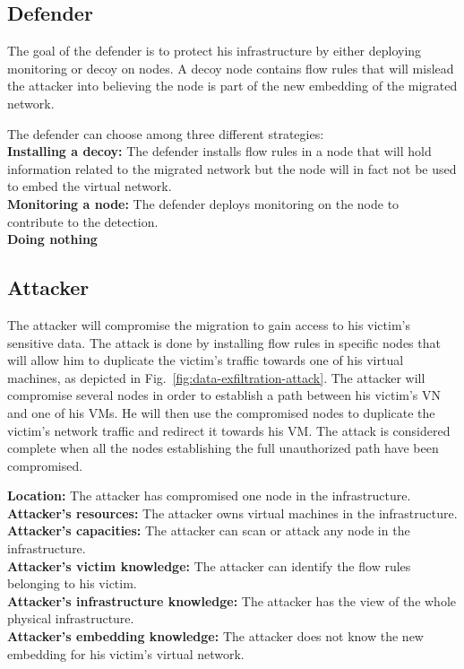 \subsection{Defender}
The goal of the defender is to protect his infrastructure by either deploying monitoring or decoy on nodes. A decoy node contains flow rules that will mislead the attacker into believing the node is part of the new embedding of the migrated network.

The defender can choose among three different strategies:\\
\textbf{Installing a decoy: } The defender installs flow rules in a node that will hold information related to the migrated network but the node will in fact not be used to embed the virtual network.\\
\textbf{Monitoring a node: } The defender deploys monitoring on the node to contribute to the detection.\\
\textbf{Doing nothing}

\subsection{Attacker}
The attacker will compromise the migration to gain access to his victim's sensitive data.
The attack is done by installing flow rules in specific nodes that will allow him to duplicate the victim's traffic towards one of his virtual machines, as depicted in Fig.~\ref{fig:data-exfiltration-attack}. 
The attacker will compromise several nodes in order to establish a path between his victim's VN and one of his VMs.
He will then use the compromised nodes to duplicate the victim's network traffic and redirect it towards his VM.
The attack is considered complete when all the nodes establishing the full unauthorized path have been compromised.

\textbf{Location: } The attacker has compromised one node in the infrastructure.\\
\textbf{Attacker's resources: } The attacker owns virtual machines in the infrastructure.\\
\textbf{Attacker's capacities: } The attacker can scan or attack any node in the infrastructure.\\
\textbf{Attacker's victim knowledge: } The attacker can identify the flow rules belonging to his victim.\\
\textbf{Attacker's infrastructure knowledge: } The attacker has the view of the whole physical infrastructure.\\
\textbf{Attacker's embedding knowledge: } The attacker does not know the new embedding for his victim's virtual network.


